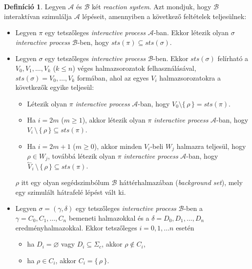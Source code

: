 \documentclass[12pt]{article}
\theoremstyle{definition}
\newtheorem{definition}{Definíció}
\theoremstyle{remark}
\theoremstyle{plain}
\theoremstyle{remark}
\theoremstyle{plain}
\let\emptyset\varnothing
\newcommand{\backwardhat}{\overset{\leftharpoonup}}
\begin{document}
    \begin{definition}\label{def:interactive-simulation}
        Legyen $\mathscr{A}$ és $\mathscr{B}$ két \textit{reaction system}. Azt mondjuk, hogy $\mathscr{B}$ interaktívan szimulálja $\mathscr{A}$ lépéseit, amennyiben a következő feltételek teljesülnek:
        \begin{itemize}
            \item
            Legyen $\pi$ egy tetszőleges \textit{interactive process} $\mathscr{A}$-ban. Ekkor létezik olyan $\sigma$ \textit{interactive process} $\mathscr{B}$-ben, hogy $\textit{sts}(\pi) \subseteq \textit{sts}(\sigma)$.

            \item
            Legyen $\sigma$ egy tetszőleges \textit{interactive process} $\mathscr{B}$-ben. Ekkor $\textit{sts}(\sigma)$ felírható a $V_{0}, V_{1}, \ldots, V_{k}$ ($k \leq n$) véges halmazsorozatok felhasználásával, $\textit{sts}(\sigma)=V_{0}, \ldots, V_{k}$ formában, ahol az egyes $V_{i}$ halmazsorozatokra a következők egyike teljesül:
            \begin{itemize}
                \item
                Létezik olyan $\pi$ \textit{interactive process} $\mathscr{A}$-ban, hogy $V_{0} \setminus \{ \, \rho \, \} = \textit{sts}(\pi)$.
                
                \item
                Ha $i = 2m$ ($m \geq 1$), akkor létezik olyan $\pi$ \textit{interactive process} $\mathscr{A}$-ban, hogy $V_{i} \,\setminus\, \{ \, \rho \, \}\subseteq \textit{sts}(\pi)$. 
                
                \item
                Ha $i = 2m + 1$ ($m \geq 0$), akkor minden $V_{i}$-beli $W_{j}$ halmazra teljesül, hogy $\rho \in W_{j}$, továbbá létezik olyan $\pi$ \textit{interactive process} $\mathscr{A}$-ban, hogy $\backwardhat V_{i} \,\setminus\, \{ \, \rho \, \} \subseteq \textit{sts}(\pi)$.
            \end{itemize}
            $\rho$ itt egy olyan segédszimbólum $\mathscr{B}$ háttérhalmazában (\textit{background set}), mely egy szimulált hátrafelé lépést vált ki.

            \item
            Legyen $\sigma = (\gamma, \delta)$ egy tetszőleges \textit{interactive process} $\mathscr{B}$-ben a $\gamma = C_{0}, C_{1}, \ldots, C_{n}$ bemeneti halmazokkal és a $\delta = D_{0}, D_{1}, \ldots, D_{n}$ eredményhalmazokkal. Ekkor tetszőleges $i = 0, 1, \ldots n$ esetén
            \begin{itemize}
                \item
                ha $D_{i} = \emptyset$ vagy $D_{i} \subseteq \Sigma_{c}$, akkor $\rho \notin C_{i}$,
                \item
                ha $\rho \in C_{i}$, akkor $C_{i} = \{ \,\rho\, \}$.
            \end{itemize}
        \end{itemize}
    \end{definition}
\end{document}
